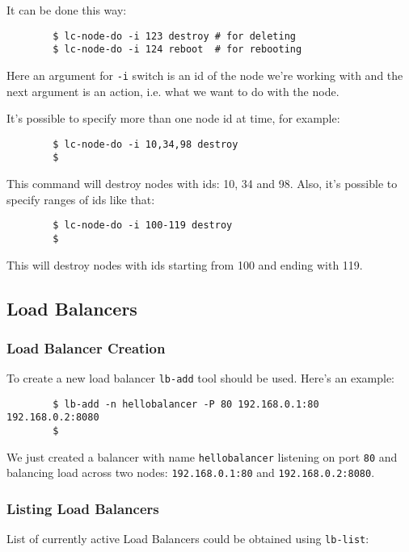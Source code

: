 \documentclass[a4paper]{report}
\begin{document}
	       It can be done this way:

	       \begin{verbatim}
		$ lc-node-do -i 123 destroy # for deleting
		$ lc-node-do -i 124 reboot  # for rebooting
		\end{verbatim}

	       Here an argument for \texttt{-i} switch is an id of the node we're working
	       with and the next argument is an action, i.e. what we want to do with the node.

	       It's possible to specify more than one node id at time, for example:

	       \begin{verbatim}
		$ lc-node-do -i 10,34,98 destroy
		$
		\end{verbatim}

	       This command will destroy nodes with ids: 10, 34 and 98. Also, it's possible to
	       specify ranges of ids like that:

	       \begin{verbatim}
		$ lc-node-do -i 100-119 destroy
		$
		\end{verbatim}

	      This will destroy nodes with ids starting from 100 and ending with 119.

          \subsection{Load Balancers}
                \subsubsection{Load Balancer Creation}
                To create a new load balancer \texttt{lb-add} tool should be used. Here's an example:

                 \begin{verbatim}
		$ lb-add -n hellobalancer -P 80 192.168.0.1:80 192.168.0.2:8080
		$
                 \end{verbatim}

                 We just created a balancer with name \texttt{hellobalancer} listening on
                 port \texttt{80} and balancing load across two nodes: \texttt{192.168.0.1:80}
                 and \texttt{192.168.0.2:8080}.

                 \subsubsection{Listing Load Balancers}
                 List of currently active Load Balancers could be obtained using \texttt{lb-list}:
\end{document}
